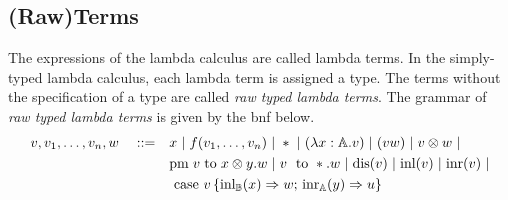 


\subsection{(Raw)Terms}


The expressions of the lambda calculus are called lambda terms. In the simply-typed lambda calculus, each lambda term is assigned a type. The terms without the specification of a type are called \emph{raw typed lambda terms}. The grammar of \emph{raw typed lambda terms} is given by the \acrshort{bnf} below.
\begin{equation*} \label{eq:grammarlambda}
\begin{split}
 v,v_1, \ldots, v_n,w \hspace{10 pt} ::= \hspace{10 pt}& x \hspace{3 pt} \vert \hspace{3 pt} f(v_1, \ldots, v_n) \hspace{3 pt} \vert \hspace{3 pt} *  \hspace{3 pt} \vert \hspace{3 pt} (\lambda x: \mathbb{A}. v )\hspace{3 pt} \vert \hspace{3 pt} (v w) \hspace{3 pt}  \vert \hspace{3 pt} v \otimes w \hspace{3 pt} \vert
 \\&    \text{pm} \hspace{3 pt} v \hspace{3 pt} \text{to} \hspace{3 pt} x \otimes y. w  \hspace{3 pt}  \vert \hspace{3 pt} v \hspace{3 pt} \text{ to } *.w \hspace{3 pt} \vert \hspace{3 pt} \text{dis}(v) \hspace{3 pt} \vert \hspace{3 pt} \text{inl} (v) \hspace{3 pt} \vert \hspace{3 pt} \text{inr} (v) \hspace{3 pt} \vert
 \\& \text{ case } v \,   \{\text{inl}_{\mathbb{B}} (x) \Rightarrow w ; \, \text{inr}_{\mathbb{A}} (y) \Rightarrow u\}
\end{split}
\end{equation*}

